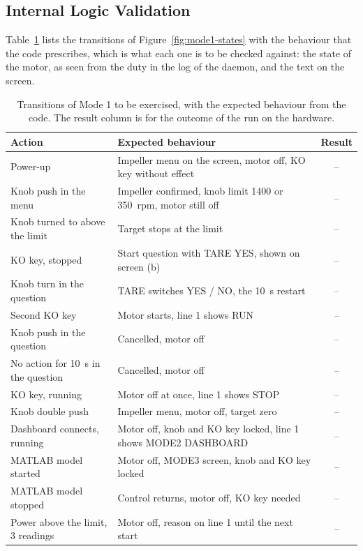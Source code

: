 \subsection{Internal Logic Validation}
\label{subsec:agit-mode1-test}

Table~\ref{tab:mode1-test} lists the transitions of Figure~\ref{fig:mode1-states} with the behaviour that the code prescribes, which is what each one is to be checked against: the state of the motor, as seen from the duty in the log of the daemon, and the text on the screen.

\begin{table}[htbp]
    \centering
    \caption[Checks of the standalone interface]{Transitions of Mode 1 to be exercised, with the expected behaviour from the code. The result column is for the outcome of the run on the hardware.}
    \label{tab:mode1-test}
    \small
    \begin{tabular}{@{}p{4.1cm}p{6.8cm}c@{}}
        \toprule
        Action & Expected behaviour & Result \\
        \midrule
        Power-up & Impeller menu on the screen, motor off, KO key without effect & -- \\
        Knob push in the menu & Impeller confirmed, knob limit 1400 or 350~rpm, motor still off & -- \\
        Knob turned to above the limit & Target stops at the limit & -- \\
        KO key, stopped & Start question with TARE YES, shown on screen (b) & -- \\
        Knob turn in the question & TARE switches YES / NO, the 10~s restart & -- \\
        Second KO key & Motor starts, line 1 shows RUN & -- \\
        Knob push in the question & Cancelled, motor off & -- \\
        No action for 10~s in the question & Cancelled, motor off & -- \\
        KO key, running & Motor off at once, line 1 shows STOP & -- \\
        Knob double push & Impeller menu, motor off, target zero & -- \\
        Dashboard connects, running & Motor off, knob and KO key locked, line 1 shows MODE2 DASHBOARD & -- \\
        MATLAB model started & Motor off, MODE3 screen, knob and KO key locked & -- \\
        MATLAB model stopped & Control returns, motor off, KO key needed & -- \\
        Power above the limit, 3 readings & Motor off, reason on line 1 until the next start & -- \\
        \bottomrule
    \end{tabular}
\end{table}


